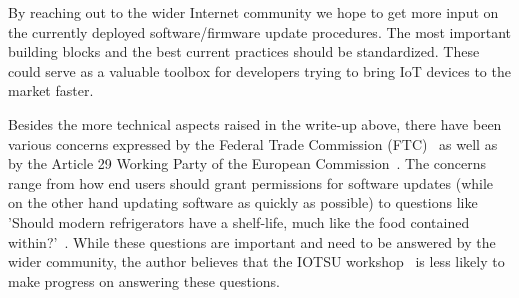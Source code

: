 \documentclass[peerreview, a4paper, 7pt]{IEEEtran}
\begin{document}
By reaching out to the wider Internet community we hope to get more input on the currently deployed software/firmware update procedures. The most important building blocks and the best current practices should be standardized. These could serve as a valuable toolbox for developers trying to bring IoT devices to the market faster.

Besides the more technical aspects raised in the write-up above, there have been various concerns expressed by the Federal Trade Commission (FTC)~\cite{FTC} as well as by the Article 29 Working Party of the European Commission~\cite{Article29WP}. The concerns range from how end users should grant permissions for software updates (while on the other hand updating software as quickly as possible) to questions like 'Should modern refrigerators have a shelf-life, much like the food contained within?'~\cite{ShelfLife}. While these questions are important and need to be answered by the wider community, the author believes that the IOTSU workshop~\cite{IOTSU} is less likely to make progress on answering these questions.  


% 

\end{document}
